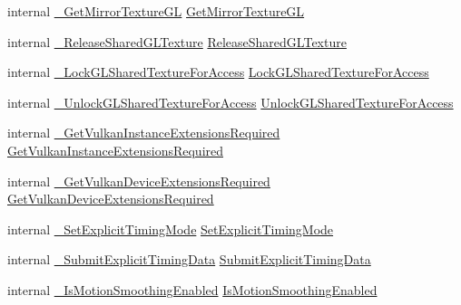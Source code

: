 \begin{DoxyCompactItemize}
\item 
internal \mbox{\hyperlink{struct_valve_1_1_v_r_1_1_i_v_r_compositor_a99ed37ffd770d7a7e9f1cd1c843b0f91}{\+\_\+\+Get\+Mirror\+Texture\+GL}} \mbox{\hyperlink{struct_valve_1_1_v_r_1_1_i_v_r_compositor_a5519fa0d05576c6021df19c08c2e350f}{Get\+Mirror\+Texture\+GL}}
\item 
internal \mbox{\hyperlink{struct_valve_1_1_v_r_1_1_i_v_r_compositor_a8007bc81c8368208327b657a2d9d70b5}{\+\_\+\+Release\+Shared\+G\+L\+Texture}} \mbox{\hyperlink{struct_valve_1_1_v_r_1_1_i_v_r_compositor_a484fee3e3816dd0734ac90ee12773abc}{Release\+Shared\+G\+L\+Texture}}
\item 
internal \mbox{\hyperlink{struct_valve_1_1_v_r_1_1_i_v_r_compositor_af32b455cb8d7467ceaed3018cc163bfe}{\+\_\+\+Lock\+G\+L\+Shared\+Texture\+For\+Access}} \mbox{\hyperlink{struct_valve_1_1_v_r_1_1_i_v_r_compositor_a1fe3254db89bea4506082adb62200cf3}{Lock\+G\+L\+Shared\+Texture\+For\+Access}}
\item 
internal \mbox{\hyperlink{struct_valve_1_1_v_r_1_1_i_v_r_compositor_ad503ea42a467e1498243ff87b76188f0}{\+\_\+\+Unlock\+G\+L\+Shared\+Texture\+For\+Access}} \mbox{\hyperlink{struct_valve_1_1_v_r_1_1_i_v_r_compositor_afee8c0932af2f5331c01b76b5023df45}{Unlock\+G\+L\+Shared\+Texture\+For\+Access}}
\item 
internal \mbox{\hyperlink{struct_valve_1_1_v_r_1_1_i_v_r_compositor_ab79e60bb33523a61ea4347c37827535f}{\+\_\+\+Get\+Vulkan\+Instance\+Extensions\+Required}} \mbox{\hyperlink{struct_valve_1_1_v_r_1_1_i_v_r_compositor_ad734c406ba294357c6a9d992154774e1}{Get\+Vulkan\+Instance\+Extensions\+Required}}
\item 
internal \mbox{\hyperlink{struct_valve_1_1_v_r_1_1_i_v_r_compositor_ab2e36a8e0528d7f4d66abc820366dba4}{\+\_\+\+Get\+Vulkan\+Device\+Extensions\+Required}} \mbox{\hyperlink{struct_valve_1_1_v_r_1_1_i_v_r_compositor_a601861efee1846fb7ffe71b6405f231a}{Get\+Vulkan\+Device\+Extensions\+Required}}
\item 
internal \mbox{\hyperlink{struct_valve_1_1_v_r_1_1_i_v_r_compositor_acec020845b093a0661c4f86e03fb4390}{\+\_\+\+Set\+Explicit\+Timing\+Mode}} \mbox{\hyperlink{struct_valve_1_1_v_r_1_1_i_v_r_compositor_aa68aa9770c77aebb53902c7b2418af99}{Set\+Explicit\+Timing\+Mode}}
\item 
internal \mbox{\hyperlink{struct_valve_1_1_v_r_1_1_i_v_r_compositor_a5db66fc4dafe46e41c5cf85bf8d1c719}{\+\_\+\+Submit\+Explicit\+Timing\+Data}} \mbox{\hyperlink{struct_valve_1_1_v_r_1_1_i_v_r_compositor_af9a37b27e8eaea8c44e974cfe051086b}{Submit\+Explicit\+Timing\+Data}}
\item 
internal \mbox{\hyperlink{struct_valve_1_1_v_r_1_1_i_v_r_compositor_a1a133e0381c30b872f74b12228080e87}{\+\_\+\+Is\+Motion\+Smoothing\+Enabled}} \mbox{\hyperlink{struct_valve_1_1_v_r_1_1_i_v_r_compositor_ae7d87c497e0e72e63a8240ba48b3398b}{Is\+Motion\+Smoothing\+Enabled}}
\end{DoxyCompactItemize}


